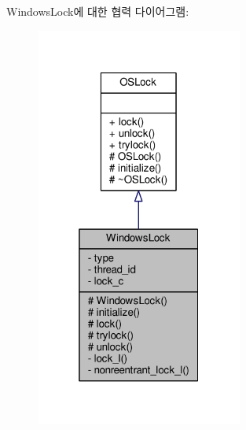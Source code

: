 Windows\+Lock에 대한 협력 다이어그램\+:
\nopagebreak
\begin{figure}[H]
\begin{center}
\leavevmode
\includegraphics[width=193pt]{class_windows_lock__coll__graph}
\end{center}
\end{figure}

